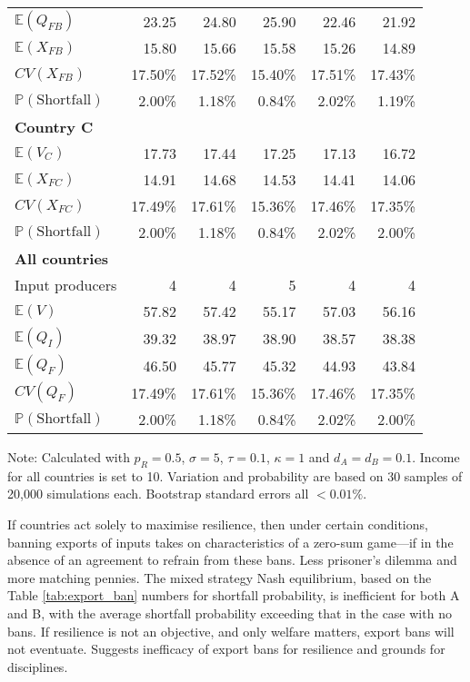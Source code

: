 \documentclass{article}
\begin{document}
\begin{table}
\begin{threeparttable}
\begin{tabular}{lrrrrr}
            $\mathbb{E}(Q_{FB})$ & 23.25 & 24.80 & 25.90 & 22.46 & 21.92 \\
            $\mathbb{E}(X_{FB})$ & 15.80 & 15.66 & 15.58 & 15.26 & 14.89 \\
            $CV(X_{FB})$ & 17.50\% & 17.52\% & 15.40\% & 17.51\% & 17.43\% \\
            $\mathbb{P}(\text{Shortfall})$ & 2.00\% & 1.18\% & 0.84\% & 2.02\% & 1.19\% \\ 
            \midrule
            \textbf{Country C} \\
            $\mathbb{E}(V_C)$ & 17.73 & 17.44 & 17.25 & 17.13 & 16.72 \\
            $\mathbb{E}(X_{FC})$ & 14.91 & 14.68 & 14.53 & 14.41 & 14.06 \\
            $CV(X_{FC})$ & 17.49\% & 17.61\% & 15.36\% & 17.46\% & 17.35\% \\
            $\mathbb{P}(\text{Shortfall})$ & 2.00\% & 1.18\% & 0.84\% & 2.02\% & 2.00\% \\ 
            \midrule
            \textbf{All countries} \\
            Input producers & 4 & 4 & 5 & 4 & 4 \\
            $\mathbb{E}(V)$ & 57.82 & 57.42 & 55.17 & 57.03 & 56.16 \\
            $\mathbb{E}(Q_I)$ & 39.32 & 38.97 & 38.90 & 38.57 & 38.38 \\
            $\mathbb{E}(Q_F)$ & 46.50 & 45.77 & 45.32 & 44.93 & 43.84 \\
            $CV(Q_F)$ & 17.49\% & 17.61\% & 15.36\% & 17.46\% & 17.35\% \\
            $\mathbb{P}(\text{Shortfall})$ & 2.00\% &1.18\% & 0.84\% & 2.02\% & 2.00\% \\ 
            \bottomrule
        \end{tabular}
        \begin{tablenotes}
            \small \item Note: Calculated with $p_R = 0.5$, $\sigma = 5$, $\tau = 0.1$, $\kappa = 1$ and $d_A = d_B = 0.1$. Income for all countries is set to 10. Variation and probability are based on 30 samples of 20,000 simulations each. Bootstrap standard errors all $<0.01\%$.
        \end{tablenotes}
    \end{threeparttable}
\end{table}

If countries act solely to maximise resilience, then under certain conditions, banning exports of inputs takes on characteristics of a zero-sum game---if in the absence of an agreement to refrain from these bans. Less prisoner's dilemma and more matching pennies. The mixed strategy Nash equilibrium, based on the Table \ref{tab:export_ban} numbers for shortfall probability, is inefficient for both A and B, with the average shortfall probability exceeding that in the case with no bans. If resilience is not an objective, and only welfare matters, export bans will not eventuate. Suggests inefficacy of export bans for resilience and grounds for disciplines.
\end{document}
